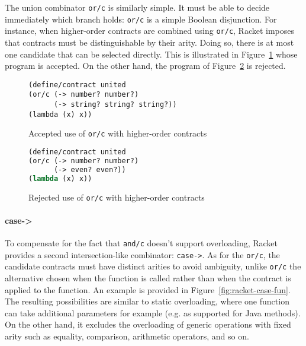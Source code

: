 \documentclass[sigplan,10pt]{acmart}
\newcommand{\unsure}[2][1=]{}
\newcommand{\racket}[1]{\lstinline[language=racket]{#1}}
\begin{document}
The union combinator \racket{or/c} is similarly simple. It must be
able to decide immediately which branch holds: \racket{or/c} is a
simple Boolean disjunction. For instance, when higher-order contracts are combined using \racket{or/c}, Racket imposes
that contracts must be distinguishable by their arity. Doing so, there is at most
one candidate that can be selected directly. This is illustrated in
Figure~\ref{code:racket:or/c:working} whose program is accepted. On the other
hand, the program of Figure~\ref{code:racket:or/c:non-working} is rejected.

\begin{figure}[h]

\begin{lstlisting}[language=racket]
(define/contract united
(or/c (-> number? number?)
      (-> string? string? string?))
(lambda (x) x))
\end{lstlisting}
\caption{Accepted use of \racket{or/c} with higher-order contracts}
\label{code:racket:or/c:working}

\end{figure}

\begin{figure}[h]

\begin{lstlisting}[language=lisp]
(define/contract united
(or/c (-> number? number?)
      (-> even? even?))
(lambda (x) x))
\end{lstlisting}
\caption{Rejected use of \racket{or/c} with higher-order contracts}
\label{code:racket:or/c:non-working}

\end{figure}


\unsure{This section is overall a bit hard to follow. I
  think I've figured out what it means, but it needs more love. Also
  give an example which doesn't work and one that does for or/c.}

\paragraph{case->}

To compensate for the fact that \racket{and/c} doesn't support
overloading,
Racket provides a second intersection-like combinator: \racket{case->}. As for the \racket{or/c}, the candidate contracts must have
distinct arities to avoid ambiguity, unlike \racket{or/c} the
alternative chosen when the function is called rather than when the
contract is applied to the function. An example is provided in
Figure~\ref{fig:racket-case-fun}. The resulting possibilities are similar
to static overloading, where one function can take additional parameters for
example (e.g. as supported for Java methods). On the other hand, it excludes the
overloading of generic operations with fixed arity such as equality, comparison,
arithmetic operators, and so on.
\end{document}
